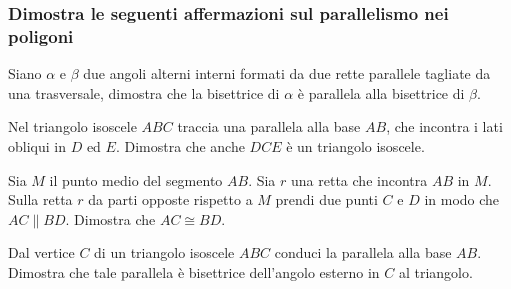 \newpage %

\subsubsection*{Dimostra le seguenti affermazioni sul parallelismo 
nei poligoni}

\vspace{-6pt}

\begin{multicols}{2}


\begin{esercizio}
  \label{ese:3.40}
  Siano $\alpha$ e $\beta$ due angoli alterni interni formati da due 
  rette parallele tagliate da una trasversale, dimostra che la 
  bisettrice di $\alpha$ è parallela alla bisettrice di $\beta$.
\end{esercizio}


\begin{esercizio}
\label{ese:3.24}
Nel triangolo isoscele $ABC$ traccia una parallela alla base $AB$, 
che incontra i lati obliqui in $D$ ed $E$. Dimostra che anche $DCE$ è 
un triangolo isoscele.
\end{esercizio}

\begin{esercizio}
\label{ese:3.26}
Sia $M$ il punto medio del segmento $AB$. Sia $r$ una retta che 
incontra $AB$ in $M$. Sulla retta $r$ da parti opposte rispetto a $M$ 
prendi due punti $C$ e $D$ in modo che $AC\parallel BD$. Dimostra che 
$AC\cong BD$. 
\end{esercizio}

\begin{esercizio}
\label{ese:3.27}
Dal vertice $C$ di un triangolo isoscele $ABC$ conduci la parallela 
alla base $AB$. Dimostra che tale parallela è bisettrice dell'angolo 
esterno in $C$ al triangolo.
\end{esercizio}


\end{multicols}
